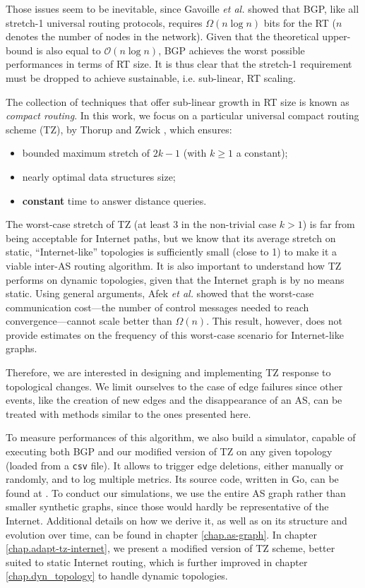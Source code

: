 \documentclass[a4paper,11pt,oneside]{report}
\begin{document}
\bigskip
Those issues seem to be inevitable, since Gavoille \textit{et al.} \cite{gavoilleMemoryRequirementRouting1996} showed that BGP, like all stretch-1 universal routing protocols, requires $\Omega(n\log n)$ bits for the RT ($n$ denotes the number of nodes in the network). Given that the theoretical upper-bound is also equal to $\mathcal{O}(n\log n)$, BGP achieves the worst possible performances in terms of RT size. It is thus clear that the stretch-1 requirement must be dropped to achieve sustainable, i.e. sub-linear, RT scaling.

The collection of techniques that offer sub-linear growth in RT size is known as \emph{compact routing}.
In this work, we focus on a particular universal compact routing scheme (TZ), by Thorup and Zwick \cite{thorupApproximateDistanceOracles2005}, which ensures:
\begin{itemize}
\item bounded maximum stretch of $2k-1$ (with $k \geq 1$ a constant);
\item nearly optimal data structures size;
\item \textbf{constant} time to answer distance queries.
\end{itemize}

The worst-case stretch of TZ (at least $3$ in the non-trivial case $k>1$) is far from being acceptable for Internet paths, but we know \cite{krioukovCompactRoutingInternet2007} that its average stretch on static, ``Internet-like'' topologies is sufficiently small (close to 1) to make it a viable inter-AS routing algorithm.
It is also important to understand how TZ performs on dynamic topologies, given that the Internet graph is by no means static. Using general arguments, Afek \textit{et al.} \cite{afekUpperLowerBounds1989} showed that the worst-case communication cost---the number of control messages needed to reach convergence---cannot scale better than $\Omega(n)$.
This result, however, does not provide estimates on the frequency of this worst-case scenario for Internet-like graphs.

\bigskip
Therefore, we are interested in designing and implementing TZ response to topological changes. We limit ourselves to the case of edge failures since other events, like the creation of new edges and the disappearance of an AS, can be treated with methods similar to the ones presented here.

To measure performances of this algorithm, we also build a simulator, capable of executing both BGP and our modified version of TZ on any given topology (loaded from a \texttt{csv} file). It allows to trigger edge deletions, either manually or randomly, and to log multiple metrics. Its source code, written in Go, can be found at \cite{RoutingAlgorithmsSimulator}. To conduct our simulations, we use the entire AS graph rather than smaller synthetic graphs, since those would hardly be representative of the Internet. Additional details on how we derive it, as well as on its structure and evolution over time, can be found in chapter \ref{chap.as-graph}.
In chapter \ref{chap.adapt-tz-internet}, we present a modified version of TZ scheme, better suited to static Internet routing, which is further improved in chapter \ref{chap.dyn_topology} to handle dynamic topologies.
\end{document}
